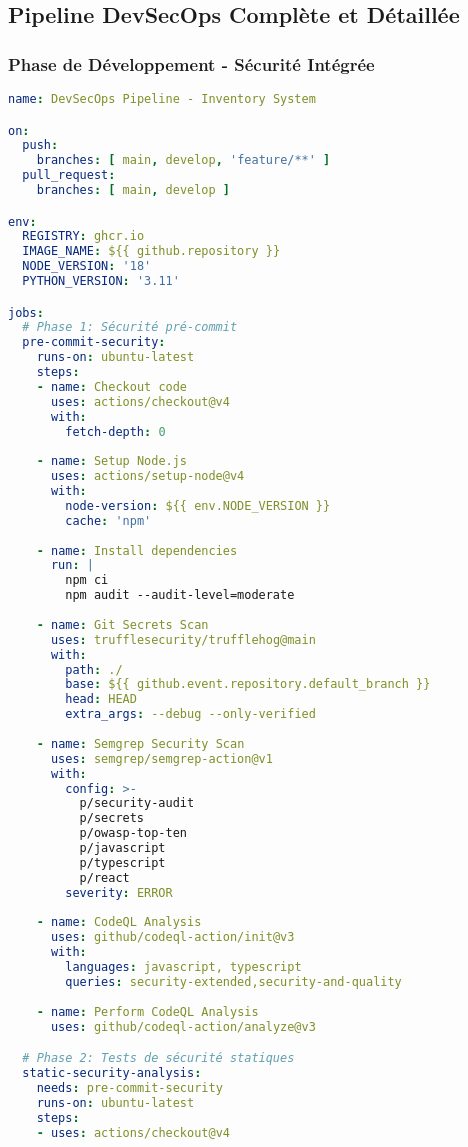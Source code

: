 \documentclass[12pt,a4paper]{report}
\begin{document}
\subsection{Pipeline DevSecOps Complète et Détaillée}

\subsubsection{Phase de Développement - Sécurité Intégrée}

\begin{lstlisting}[language=YAML, caption=Pipeline GitHub Actions DevSecOps complète]
name: DevSecOps Pipeline - Inventory System

on:
  push:
    branches: [ main, develop, 'feature/**' ]
  pull_request:
    branches: [ main, develop ]

env:
  REGISTRY: ghcr.io
  IMAGE_NAME: ${{ github.repository }}
  NODE_VERSION: '18'
  PYTHON_VERSION: '3.11'

jobs:
  # Phase 1: Sécurité pré-commit
  pre-commit-security:
    runs-on: ubuntu-latest
    steps:
    - name: Checkout code
      uses: actions/checkout@v4
      with:
        fetch-depth: 0
    
    - name: Setup Node.js
      uses: actions/setup-node@v4
      with:
        node-version: ${{ env.NODE_VERSION }}
        cache: 'npm'
    
    - name: Install dependencies
      run: |
        npm ci
        npm audit --audit-level=moderate
    
    - name: Git Secrets Scan
      uses: trufflesecurity/trufflehog@main
      with:
        path: ./
        base: ${{ github.event.repository.default_branch }}
        head: HEAD
        extra_args: --debug --only-verified
    
    - name: Semgrep Security Scan
      uses: semgrep/semgrep-action@v1
      with:
        config: >-
          p/security-audit
          p/secrets
          p/owasp-top-ten
          p/javascript
          p/typescript
          p/react
        severity: ERROR
        
    - name: CodeQL Analysis
      uses: github/codeql-action/init@v3
      with:
        languages: javascript, typescript
        queries: security-extended,security-and-quality
    
    - name: Perform CodeQL Analysis
      uses: github/codeql-action/analyze@v3

  # Phase 2: Tests de sécurité statiques
  static-security-analysis:
    needs: pre-commit-security
    runs-on: ubuntu-latest
    steps:
    - uses: actions/checkout@v4
    

\end{lstlisting}
\end{document}
